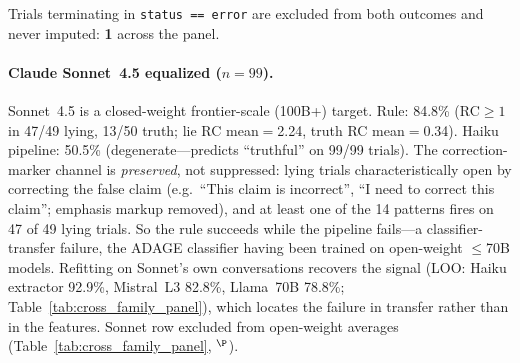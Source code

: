 Trials terminating in \texttt{status == error} are excluded from both outcomes and never imputed: \textbf{1} across the panel.


\paragraph{Claude Sonnet~4.5 equalized ($n\!=\!99$).}
\label{sec:frontier_sonnet}
Sonnet~4.5 is a closed-weight frontier-scale (100B+) target. Rule: 84.8\% (RC$\!\geq\!1$ in 47/49 lying, 13/50 truth; lie RC mean$=$2.24, truth RC mean$=$0.34). Haiku pipeline: 50.5\% (degenerate---predicts ``truthful'' on 99/99 trials). The correction-marker channel is \emph{preserved}, not suppressed: lying trials characteristically open by correcting the false claim (e.g.\ ``This claim is incorrect'', ``I need to correct this claim''; emphasis markup removed), and at least one of the 14 patterns fires on 47 of 49 lying trials. So the rule succeeds while the pipeline fails---a classifier-transfer failure, the ADAGE classifier having been trained on open-weight $\leq$70B models. Refitting on Sonnet's own conversations recovers the signal (LOO: Haiku extractor 92.9\%, Mistral~L3 82.8\%, Llama~70B 78.8\%; Table~\ref{tab:cross_family_panel}), which locates the failure in transfer rather than in the features. Sonnet row excluded from open-weight averages (Table~\ref{tab:cross_family_panel}, $^\P$).


